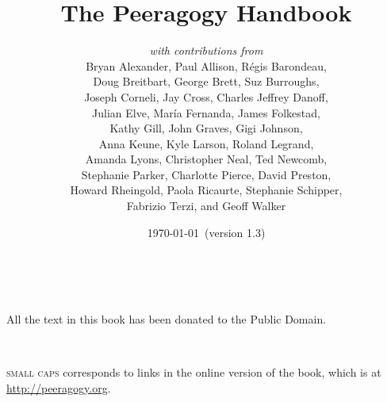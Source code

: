 \documentclass[ebook, 12pt, twoside]{memoir}
\let\sc\scshape
\let\sc\scshape
\begin{document}
\sloppy 
{}
\title{The Peeragogy Handbook\\[1in]}
\author{
\emph{with contributions from} \\
{\small Bryan Alexander, Paul Allison, R\'egis Barondeau,} \\
{\small Doug Breitbart, George Brett, Suz Burroughs, }\\ 
{\small Joseph Corneli, Jay Cross, Charles Jeffrey Danoff,}\\
{\small Julian Elve, Mar\'ia Fernanda, James Folkestad, }\\
{\small Kathy Gill, John Graves, Gigi Johnson,} \\
{\small Anna Keune, Kyle Larson, Roland Legrand, } \\
{\small Amanda Lyons, Christopher Neal, Ted Newcomb,} \\
{\small Stephanie Parker, Charlotte Pierce, David Preston,} \\
{\small Howard Rheingold, Paola Ricaurte, Stephanie Schipper,}\\
{\small Fabrizio Terzi, and Geoff Walker}
}
\date{\today\ (version 1.3)}
\maketitle
\thispagestyle{empty}

\quad \\[3in] 
\begin{center}
{\large All the text in this book has been donated to the Public Domain.}
\end{center}
\quad \\
\begin{center}
{\large {\sc small caps} corresponds to links in the online
  version of the book, which is at \url{http://peeragogy.org}.}
\end{center}
\thispagestyle{empty}
\cleardoublepage
\end{document}
